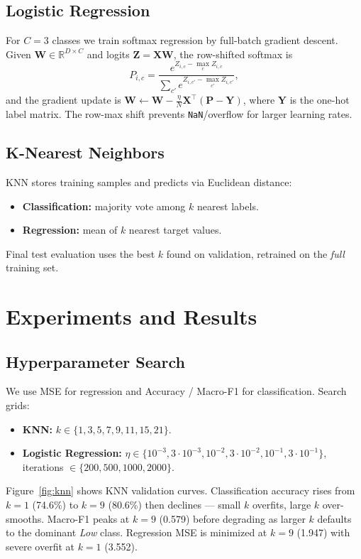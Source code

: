 \documentclass[10pt, twocolumn, letterpaper]{article}
\begin{document}
\subsection{Logistic Regression}
For $C{=}3$ classes we train softmax regression by full-batch gradient descent. Given $\mathbf{W}\in\mathbb{R}^{D\times C}$ and logits $\mathbf{Z}=\mathbf{XW}$, the row-shifted softmax is
\[
    P_{i,c}=\frac{e^{Z_{i,c}-\max_c Z_{i,c}}}{\sum_{c'}e^{Z_{i,c'}-\max_{c'} Z_{i,c'}}},
\]
and the gradient update is $\mathbf{W}\!\leftarrow\!\mathbf{W} - \tfrac{\eta}{N}\mathbf{X}^{\top}(\mathbf{P}-\mathbf{Y})$, where $\mathbf{Y}$ is the one-hot label matrix. The row-max shift prevents \texttt{NaN}/overflow for larger learning rates.

\subsection{K-Nearest Neighbors}
KNN stores training samples and predicts via Euclidean distance:
\begin{itemize}[noitemsep, nolistsep, leftmargin=*]
    \item \textbf{Classification:} majority vote among $k$ nearest labels.
    \item \textbf{Regression:} mean of $k$ nearest target values.
\end{itemize}
Final test evaluation uses the best $k$ found on validation, retrained on the \emph{full} training set.

\section{Experiments and Results}
\subsection{Hyperparameter Search}
We use MSE for regression and Accuracy / Macro-F1 for classification. Search grids:
\begin{itemize}[noitemsep, nolistsep, leftmargin=*]
    \item \textbf{KNN:} $k\in\{1,3,5,7,9,11,15,21\}$.
    \item \textbf{Logistic Regression:} $\eta\in\{10^{-3},3{\cdot}10^{-3},10^{-2},3{\cdot}10^{-2},10^{-1},3{\cdot}10^{-1}\}$, iterations $\in\{200,500,1000,2000\}$.
\end{itemize}

Figure~\ref{fig:knn} shows KNN validation curves. Classification accuracy rises from $k{=}1$ (74.6\%) to $k{=}9$ (80.6\%) then declines — small $k$ overfits, large $k$ over-smooths. Macro-F1 peaks at $k{=}9$ (0.579) before degrading as larger $k$ defaults to the dominant \emph{Low} class. Regression MSE is minimized at $k{=}9$ (1.947) with severe overfit at $k{=}1$ (3.552).
\end{document}
